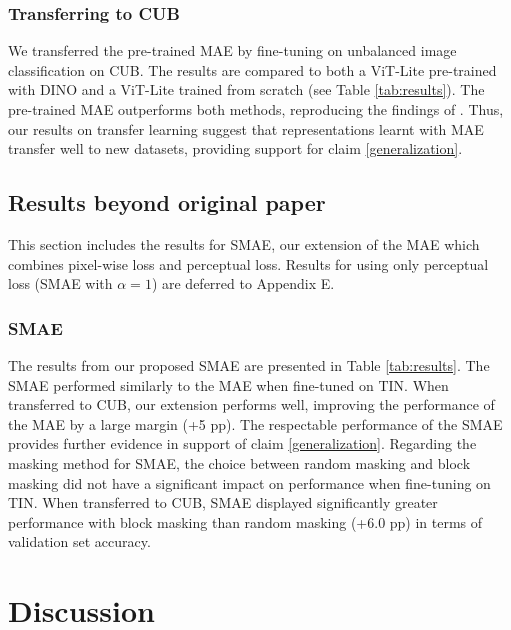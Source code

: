 \subsubsection{Transferring to CUB} We transferred the pre-trained MAE by fine-tuning on unbalanced image classification on CUB. The results are compared to both a ViT-Lite pre-trained with DINO and a ViT-Lite trained from scratch (see Table \ref{tab:results}). The pre-trained MAE outperforms both methods, reproducing the findings of \cite{mae}. Thus, our results on transfer learning suggest that representations learnt with MAE transfer well to new datasets, providing support for claim \ref{generalization}.



\subsection{Results beyond original paper}
This section includes the results for SMAE, our extension of the MAE which combines pixel-wise loss and perceptual loss. Results for using only perceptual loss (SMAE with $\alpha=1$) are deferred to Appendix E.

\subsubsection{SMAE}
The results from our proposed SMAE are presented in Table \ref{tab:results}. The SMAE performed similarly to the MAE when fine-tuned on TIN. When transferred to CUB, our extension performs well, improving the performance of the MAE by a large margin (+5 pp). The respectable performance of the SMAE provides further evidence in support of claim \ref{generalization}. Regarding the masking method for SMAE, the choice between random masking and block masking did not have a significant impact on performance when fine-tuning on TIN. When transferred to CUB, SMAE displayed significantly greater performance with block masking than random masking (+6.0 pp) in terms of validation set accuracy.


\section{Discussion}

